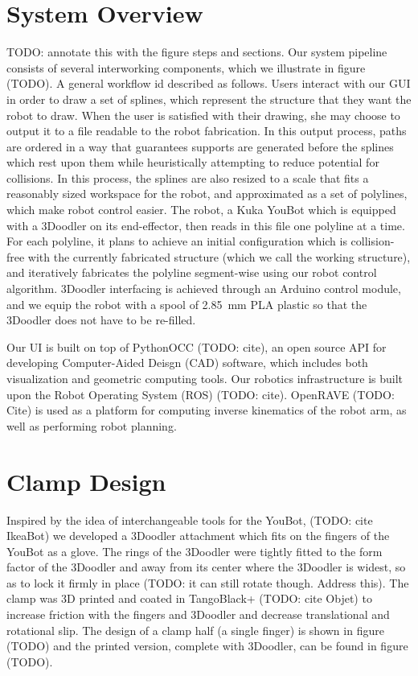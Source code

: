 \documentclass[conference]{acmsiggraph}
\begin{document}
\section{System Overview}
TODO: annotate this with the figure steps and sections.
Our system pipeline consists of several interworking components, which we illustrate in figure (TODO).  A general workflow id described as follows.  Users interact with our GUI in order to draw a set of splines, which represent the structure that they want the robot to draw.  When the user is satisfied with their drawing, she may choose to output it to a file readable to the robot fabrication.  In this output process, paths are ordered in a way that guarantees supports are generated before the splines which rest upon them while heuristically attempting to reduce potential for collisions.  In this process, the splines are also resized to a scale that fits a reasonably sized workspace for the robot, and approximated as a set of polylines, which make robot control easier.  The robot, a Kuka YouBot which is equipped with a 3Doodler on its end-effector, then reads in this file one polyline at a time.  For each polyline, it plans to achieve an initial configuration which is collision-free with the currently fabricated structure (which we call the working structure), and iteratively fabricates the polyline segment-wise using our robot control algorithm.  3Doodler interfacing is achieved through an Arduino control module, and we equip the robot with a spool of 2.85~mm PLA plastic so that the 3Doodler does not have to be re-filled.

Our UI is built on top of PythonOCC (TODO: cite), an open source API for developing Computer-Aided Deisgn (CAD) software, which includes both visualization and geometric computing tools.  Our robotics infrastructure is built upon the Robot Operating System (ROS) (TODO: cite).  OpenRAVE (TODO: Cite) is used as a platform for computing inverse kinematics of the robot arm, as well as performing robot planning.



\section{Clamp Design}
Inspired by the idea of interchangeable tools for the YouBot, (TODO: cite IkeaBot) we developed a 3Doodler attachment which fits on the fingers of the YouBot as a glove.  The rings of the 3Doodler were tightly fitted to the form factor of the 3Doodler and away from its center where the 3Doodler is widest, so as to lock it firmly in place (TODO: it can still rotate though.  Address this). The clamp was 3D printed and coated in TangoBlack+ (TODO: cite Objet) to increase friction with the fingers and 3Doodler and decrease translational and rotational slip.  The design of a clamp half (a single finger) is shown in figure (TODO) and the printed version, complete with 3Doodler, can be found in figure (TODO).  
\end{document}
